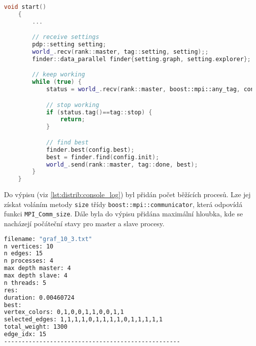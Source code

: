 \begin{lstlisting}[language=C++, label={lst:distrib:start}, title={Hlavní metoda třídy slave procesu}]
    void start()
    {
        ...

        // receive settings
        pdp::setting setting;
        world_.recv(rank::master, tag::setting, setting);;
        finder::data_parallel finder{setting.graph, setting.explorer};

        // keep working
        while (true) {
            status = world_.recv(rank::master, boost::mpi::any_tag, config);

            // stop working
            if (status.tag()==tag::stop) {
                return;
            }

            // find best
            finder.best(config.best);
            best = finder.find(config.init);
            world_.send(rank::master, tag::done, best);
        }
    }
\end{lstlisting}

Do výpisu (viz \ref{lst:distrib:console_log}) byl přidán počet běžících procesů.
Lze jej získat voláním metody \texttt{size} třídy \linebreak \texttt{boost::mpi::communicator}, která odpovídá funkci \texttt{MPI\_Comm\_size}.
Dále byla do výpisu přidána maximální hloubka, kde se nacházejí počáteční stavy pro master a slave procesy.

\begin{lstlisting}[language=bash, label={lst:distrib:console_log}, title={Příklad výpisu výsledků}]
filename: "graf_10_3.txt"
n vertices: 10
n edges: 15
n processes: 4
max depth master: 4
max depth slave: 4
n threads: 5
res:
duration: 0.00460724
best:
vertex_colors: 0,1,0,0,1,1,0,0,1,1
selected_edges: 1,1,1,1,0,1,1,1,1,0,1,1,1,1,1
total_weight: 1300
edge_idx: 15
--------------------------------------------------
\end{lstlisting}






